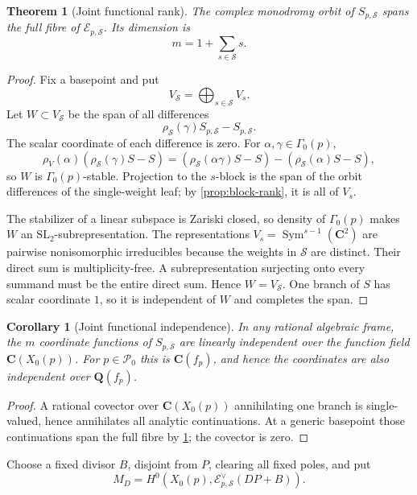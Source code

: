 \documentclass[11pt]{article}
\newtheorem{theorem}{Theorem}[section]
\newtheorem{corollary}[corollary]{Corollary}
\theoremstyle{definition}
\theoremstyle{remark}
\newcommand{\Q}{\mathbf Q}
\newcommand{\C}{\mathbf C}
\newcommand{\Sym}{\operatorname{Sym}}
\newcommand{\calE}{\mathcal E}
\begin{document}
\begin{theorem}[Joint functional rank]\label{thm:joint-rank}
The complex monodromy orbit of $S_{p,\mathcal S}$ spans the full fibre of
$\calE_{p,\mathcal S}$.  Its dimension is
\[
 m=1+\sum_{s\in\mathcal S}s.
\]
\end{theorem}

\begin{proof}
Fix a basepoint and put
\[
 V_{\mathcal S}=\bigoplus_{s\in\mathcal S}V_s.
\]
Let $W\subset V_{\mathcal S}$ be the span of all differences
\[
 \rho_{\mathcal S}(\gamma)S_{p,\mathcal S}-S_{p,\mathcal S}.
\]
The scalar coordinate of each difference is zero.  For
$\alpha,\gamma\in\Gamma_0(p)$,
\[
 \rho_V(\alpha)
 \left(\rho_{\mathcal S}(\gamma)S-S\right)
 =\left(\rho_{\mathcal S}(\alpha\gamma)S-S\right)
 -\left(\rho_{\mathcal S}(\alpha)S-S\right),
\]
so $W$ is $\Gamma_0(p)$-stable.  Projection to the $s$-block is the span of
the orbit differences of the single-weight leaf; by
\cref{prop:block-rank}, it is all of $V_s$.

The stabilizer of a linear subspace is Zariski closed, so density of
$\Gamma_0(p)$ makes $W$ an $\mathrm{SL}_2$-subrepresentation.  The
representations $V_s=\Sym^{s-1}(\C^2)$ are pairwise nonisomorphic irreducibles
because the weights in $\mathcal S$ are distinct.  Their direct sum is
multiplicity-free.  A subrepresentation surjecting onto every summand must be
the entire direct sum.  Hence $W=V_{\mathcal S}$.  One branch of $S$ has
scalar coordinate $1$, so it is independent of $W$ and completes the span.
\end{proof}

\begin{corollary}[Joint functional independence]\label{cor:joint-independence}
In any rational algebraic frame, the $m$ coordinate functions of
$S_{p,\mathcal S}$ are linearly independent over the function field
$\C(X_0(p))$.  For $p\in\mathcal P_0$ this is $\C(f_p)$, and hence the
coordinates are also independent over $\Q(f_p)$.
\end{corollary}

\begin{proof}
A rational covector over $\C(X_0(p))$ annihilating one branch is
single-valued, hence annihilates all analytic continuations.  At a generic
basepoint those continuations span the full fibre by \cref{thm:joint-rank};
the covector is zero.
\end{proof}

Choose a fixed divisor $B$, disjoint from $P$, clearing all fixed poles, and
put
\begin{equation}\label{eq:source}
 M_D=H^0\left(X_0(p),\calE_{p,\mathcal S}^\vee(DP+B)\right).
\end{equation}
\end{document}

